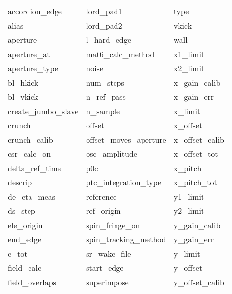  \begin{tabular}{lll} \toprule
accordion_edge              & lord_pad1                   & type                        \\
alias                       & lord_pad2                   & vkick                       \\
aperture                    & l_hard_edge                 & wall                        \\
aperture_at                 & mat6_calc_method            & x1_limit                    \\
aperture_type               & noise                       & x2_limit                    \\
bl_hkick                    & num_steps                   & x_gain_calib                \\
bl_vkick                    & n_ref_pass                  & x_gain_err                  \\
create_jumbo_slave          & n_sample                    & x_limit                     \\
crunch                      & offset                      & x_offset                    \\
crunch_calib                & offset_moves_aperture       & x_offset_calib              \\
csr_calc_on                 & osc_amplitude               & x_offset_tot                \\
delta_ref_time              & p0c                         & x_pitch                     \\
descrip                     & ptc_integration_type        & x_pitch_tot                 \\
de_eta_meas                 & reference                   & y1_limit                    \\
ds_step                     & ref_origin                  & y2_limit                    \\
ele_origin                  & spin_fringe_on              & y_gain_calib                \\
end_edge                    & spin_tracking_method        & y_gain_err                  \\
e_tot                       & sr_wake_file                & y_limit                     \\
field_calc                  & start_edge                  & y_offset                    \\
field_overlaps              & superimpose                 & y_offset_calib              \\

\end{tabular}
